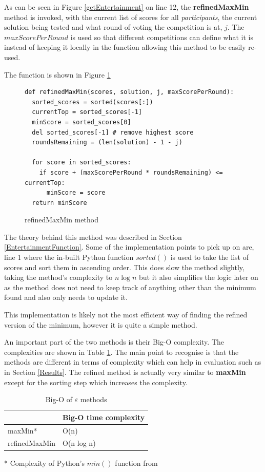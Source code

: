\documentclass[12pt]{report}
\begin{document}
As can be seen in Figure \ref{getEntertainment} on line 12, the \textbf{refinedMaxMin} method is invoked, with the current list of scores for all \textit{participants}, the current solution being tested and what round of voting the competition is at, $j$. The $maxScorePerRound$ is used so that different competitions can define what it is instead of keeping it locally in the function allowing this method to be easily re-used.

The function is shown in Figure \ref{refMaxMin}

\begin{figure}[H]
\caption{refinedMaxMin method}
\label{refMaxMin}
\begin{lstlisting}
def refinedMaxMin(scores, solution, j, maxScorePerRound):
  sorted_scores = sorted(scores[:])
  currentTop = sorted_scores[-1]
  minScore = sorted_scores[0]
  del sorted_scores[-1] # remove highest score
  roundsRemaining = (len(solution) - 1 - j)

  for score in sorted_scores:
    if score + (maxScorePerRound * roundsRemaining) <= currentTop:
      minScore = score
  return minScore
\end{lstlisting}
\end{figure}

The theory behind this method was described in Section \ref{EntertainmentFunction}. Some of the implementation points to pick up on are, line 1 where the in-built Python function $sorted()$\cite{PythonSorted} is used to take the list of scores and sort them in ascending order. This does slow the method slightly, taking the method's complexity to $n \log n$ but it also simplifies the logic later on as the method does not need to keep track of anything other than the minimum found and also only needs to update it.

This implementation is likely not the most efficient way of finding the refined version of the minimum, however it is quite a simple method. 

An important part of the two methods is their Big-O complexity. The complexities are shown in Table \ref{maxMinComp}. The main point to recognise is that the methods are different in terms of complexity which can help in evaluation such as in Section \ref{Results}. The refined method is actually very similar to \textbf{maxMin} except for the sorting step which increases the complexity.

\begin{table}[H]
\centering
\caption{Big-O of $\varepsilon$ methods}
\label{maxMinComp}
\begin{tabular}{|l|l|}
\hline
              & Big-O time complexity \\ \hline
maxMin*  & O(n) \\ \hline
refinedMaxMin & O(n log n)               \\ \hline
\end{tabular}
\end{table}
* Complexity of Python's $min()$ function from\cite{PythonComplexities}
\end{document}

